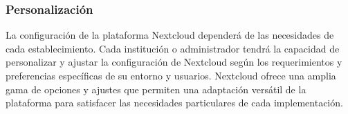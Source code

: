 			\subsubsection{Personalización}
			La configuración de la plataforma Nextcloud dependerá de las necesidades de cada establecimiento. Cada institución o administrador tendrá la capacidad de personalizar y ajustar la configuración de Nextcloud según los requerimientos y preferencias específicas de su entorno y usuarios. Nextcloud ofrece una amplia gama de opciones y ajustes que permiten una adaptación versátil de la plataforma para satisfacer las necesidades particulares de cada implementación.